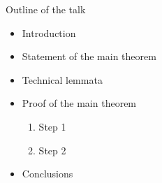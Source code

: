\documentclass{beamer}
\begin{document}
 
 
\begin{frame}{Outline of the talk} 
 
\begin{itemize} 
  \item<1-> Introduction 
  \item<2-> Statement of the main theorem 
  \item<3-> Technical lemmata 
  \item<4-> Proof of the main theorem 
  \begin{enumerate}
    \item<5-> Step 1
    \item<6-> Step 2
  \end{enumerate}
  \item<-2,4-5,7> Conclusions  %
\end{itemize} 
 
\end{frame} 
 
\end{document}
